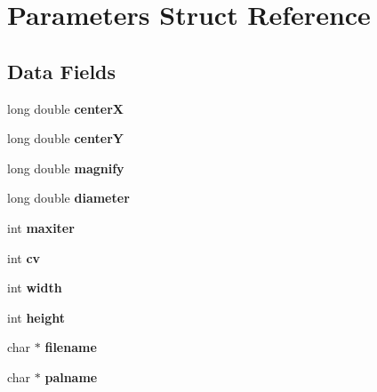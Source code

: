 \hypertarget{struct_parameters}{}\section{Parameters Struct Reference}
\label{struct_parameters}
\subsection*{Data Fields}
\begin{DoxyCompactItemize}
\item 
\mbox{\label{struct_parameters_a77a4b596ca7a32175d60ff750748af21}} 
long double {\bfseries centerX}
\item 
\mbox{\label{struct_parameters_a9f486cabe8205f5c1ee65ecc885e4b86}} 
long double {\bfseries centerY}
\item 
\mbox{\label{struct_parameters_a90f665266505361517c0b1af718b2d4a}} 
long double {\bfseries magnify}
\item 
\mbox{\label{struct_parameters_a039d46f92783f0b6b7d2d1500fdbe0c8}} 
long double {\bfseries diameter}
\item 
\mbox{\label{struct_parameters_ac52eab28b83153725ee22ba6700f848e}} 
int {\bfseries maxiter}
\item 
\mbox{\label{struct_parameters_a47505a58a58119e1de3adf8b84e8a33e}} 
int {\bfseries cv}
\item 
\mbox{\label{struct_parameters_ae8f341732b04b09c84f67f0439efb79d}} 
int {\bfseries width}
\item 
\mbox{\label{struct_parameters_aa0985d56460f9fd14ab4696c0ddcd700}} 
int {\bfseries height}
\item 
\mbox{\label{struct_parameters_a23b676a85d6a74715ebf52d083b26d41}} 
char $\ast$ {\bfseries filename}
\item 
\mbox{\label{struct_parameters_af435d3291ff1a66552d9f3383c6a517c}} 
char $\ast$ {\bfseries palname}

\end{DoxyCompactItemize}
